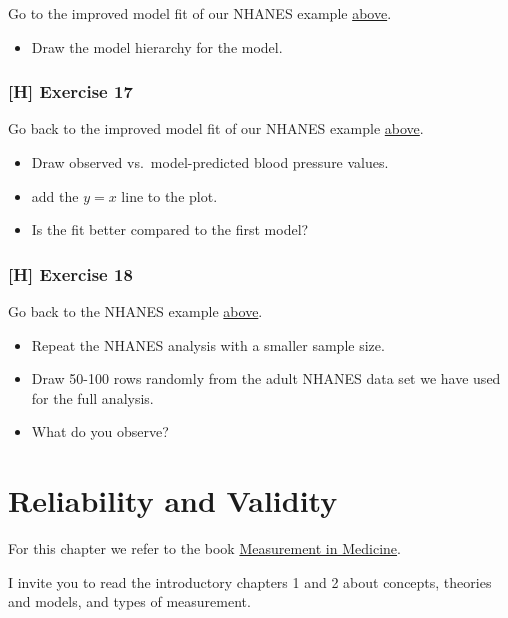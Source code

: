 \documentclass[
]{book}
\providecommand{\tightlist}{%
  \setlength{\itemsep}{0pt}\setlength{\parskip}{0pt}}
\begin{document}
Go to the improved model fit of our NHANES example \hyperref[improve_model_NHANES]{above}.

\begin{itemize}
\tightlist
\item
  Draw the model hierarchy for the model.
\end{itemize}

\subsection{{[}H{]} Exercise 17}\label{exercise17_multiple_regression}

Go back to the improved model fit of our NHANES example \hyperref[improve_model_NHANES]{above}.

\begin{itemize}
\tightlist
\item
  Draw observed vs.~model-predicted blood pressure values.
\item
  add the \(y=x\) line to the plot.
\item
  Is the fit better compared to the first model?
\end{itemize}

\subsection{{[}H{]} Exercise 18}\label{exercise18_multiple_regression}

Go back to the NHANES example \hyperref[example_nhanes]{above}.

\begin{itemize}
\tightlist
\item
  Repeat the NHANES analysis with a smaller sample size.
\item
  Draw 50-100 rows randomly from the adult NHANES data set we have used for the full
  analysis.
\item
  What do you observe?
\end{itemize}

\chapter{Reliability and Validity}\label{reliability-and-validity}

For this chapter we refer to the book
\href{https://www.cambridge.org/core/books/measurement-in-medicine/8BD913A1DA0ECCBA951AC4C1F719BCC5}{Measurement in Medicine}.

I invite you to read the introductory chapters 1 and 2 about concepts,
theories and models, and types of measurement.
\end{document}
